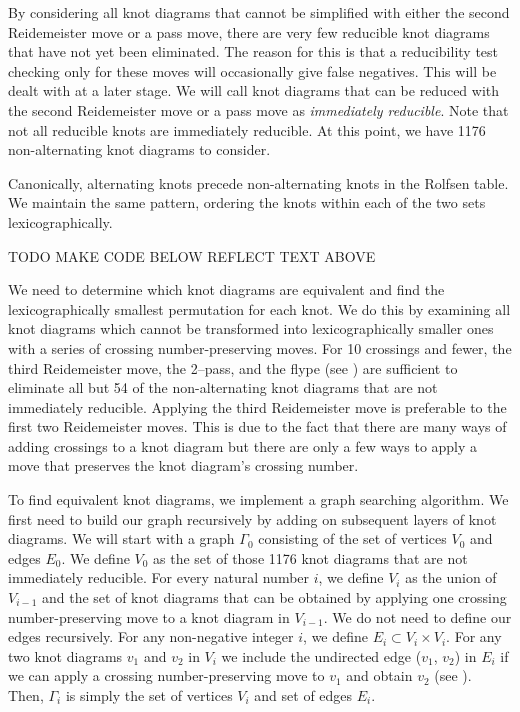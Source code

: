 \begin{paper}

By considering all knot diagrams that cannot be simplified with either the
second Reidemeister move or a pass move, there are very few reducible knot
diagrams that have not yet been eliminated.
The reason for this is that a reducibility test checking only for these moves
will occasionally give false negatives.
This will be dealt with at a later stage.
We will call knot diagrams that can be reduced with the second Reidemeister move
or a pass move as \textit{immediately reducible}.
Note that not all reducible knots are immediately reducible.
At this point, we have 1176 non-alternating knot diagrams to consider.



Canonically, alternating knots precede non-alternating knots in the Rolfsen
table.
We maintain the same pattern, ordering the knots within each of the two sets
lexicographically.

TODO MAKE CODE BELOW REFLECT TEXT ABOVE


We need to determine which knot diagrams are equivalent and find the
lexicographically smallest permutation for each knot.
We do this by examining all knot diagrams which cannot be transformed into
lexicographically smaller ones with a series of crossing number-preserving
moves.
For 10 crossings and fewer, the third Reidemeister move, the 2--pass, and the
flype (see \figMoves) are sufficient to eliminate all but 54 of the
non-alternating knot diagrams that are not immediately reducible.
Applying the third Reidemeister move is preferable to the first two Reidemeister
moves.
This is due to the fact that there are many ways of adding crossings to a knot
diagram but there are only a few ways to apply a move that preserves the knot
diagram's crossing number.


To find equivalent knot diagrams, we implement a graph searching algorithm.
We first need to build our graph recursively by adding on subsequent layers of
knot diagrams.
We will start with a graph $\Gamma_0$ consisting of the set of vertices $V_0$
and edges $E_0$.
We define $V_0$ as the set of those 1176 knot diagrams that are not immediately
reducible.
For every natural number $i$, we define $V_i$ as the union of $V_{i-1}$ and the
set of knot diagrams that can be obtained by applying one crossing
number-preserving move to a knot diagram in $V_{i-1}$.
We do not need to define our edges recursively.
For any non-negative integer $i$, we define $E_i\subset V_i\times V_i$.
For any two knot diagrams $v_1$ and $v_2$ in $V_i$ we include the undirected
edge ($v_1$, $v_2$) in $E_i$ if we can apply a crossing number-preserving move
to $v_1$ and obtain $v_2$ (see \figMoves).
Then, $\Gamma_i$ is simply the set of vertices $V_i$ and set of edges $E_i$.


\end{paper}
